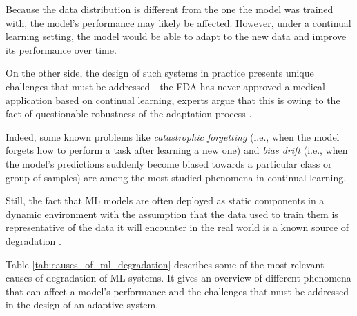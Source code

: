 \documentclass[../main.tex]{subfiles}
\begin{document}
    Because the data distribution is different from the one the model was trained with, the model's performance may likely be affected. However, under a continual learning setting, the model would be able to adapt to the new data and improve its performance over time. 

    
    On the other side, the design of such systems in practice presents unique challenges that must be addressed - the FDA has never approved a medical application based on continual learning, experts argue that this is owing to the fact of questionable robustness of the adaptation process \cite{vokingerContinualLearningMedical2021}. 
    
    Indeed, some known problems like \textit{catastrophic forgetting} (i.e., when the model forgets how to perform a task after learning a new one) and \textit{bias drift} (i.e., when the model's predictions suddenly become biased towards a particular class or group of samples) are among the most studied phenomena in continual learning.
    
    
    Still, the fact that ML models are often deployed as static components in a dynamic environment with the assumption that the data used to train them is representative of the data it will encounter in the real world is a known source of degradation \cite{vokingerContinualLearningMedical2021}.

    Table \ref{tab:causes_of_ml_degradation} describes some of the most relevant causes of degradation of ML systems. It gives an overview of different phenomena that can affect a model's performance and the challenges that must be addressed in the design of an adaptive system.
\end{document}
